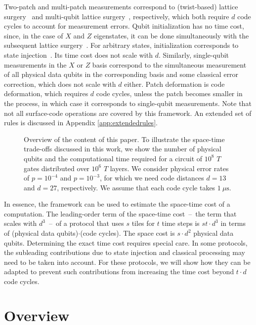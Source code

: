 \documentclass[prx,aps,letterpaper,twocolumn,allowfontchageintitle=true,accepted=2019-02-01]{quantumarticle}
\begin{document}
Two-patch and multi-patch measurements correspond to (twist-based) lattice surgery~\cite{Horsman2012,Litinski2017b} and multi-qubit lattice surgery~\cite{Fowler2018}, respectively, which both  require $d$ code cycles to account for measurement errors. Qubit initialization has no time cost, since, in the case of $X$ and $Z$ eigenstates, it can be done simultaneously with the subsequent lattice surgery~\cite{Horsman2012,Landahl2014}. For arbitrary states, initialization corresponds to state injection~\cite{Landahl2014,Li2015}. Its time cost does not scale with $d$. Similarly, single-qubit measurements in the $X$ or $Z$ basis correspond to the simultaneous measurement of all physical data qubits in the corresponding basis and some classical error correction, which does not scale with $d$ either. Patch deformation is code deformation, which requires $d$ code cycles, unless the patch becomes smaller in the process, in which case it corresponds to single-qubit measurements. Note that not all surface-code operations are covered by this framework. An extended set of rules is discussed in Appendix \ref{app:extendedrules}.

\begin{figure}[t]
\centering
\def\svgwidth{\linewidth}

\caption{Overview of the content of this paper. To illustrate the space-time trade-offs discussed in this work, we show the number of physical qubits and the computational time required for a circuit of $10^8$ $T$ gates distributed over $10^6$ $T$ layers. We consider physical error rates of $p=10^{-4}$ and $p=10^{-3}$, for which we need code distances $d=13$ and $d=27$, respectively. We assume that each code cycle takes $1~\mu \mathrm{s}$.}
\label{fig:overview}
\end{figure}

In essence, the framework can be used to estimate the space-time cost of a computation. The leading-order term of the space-time cost~--~the term that scales with $d^3$~--~of a protocol that uses $s$ tiles for $t$ time steps is $st\cdot d^3$ in terms of (physical data qubits)$\cdot$(code cycles). The space cost is $s \cdot d^2$ physical data qubits. Determining the exact time cost requires special care. In some protocols, the subleading contributions due to state injection and classical processing may need to be taken into account. For these protocols, we will show how they can be adapted to prevent such contributions from increasing the time cost beyond $t \cdot d$ code cycles.

\section*{Overview}
\end{document}
